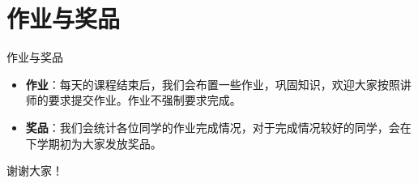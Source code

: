 \documentclass{beamer}
\begin{document}
    \section{作业与奖品}

    \begin{frame}{作业与奖品}
        \begin{itemize}
            \item \textbf{作业}：每天的课程结束后，我们会布置一些作业，巩固知识，欢迎大家按照讲师的要求提交作业。作业不强制要求完成。
            \item \textbf{奖品}：我们会统计各位同学的作业完成情况，对于完成情况较好的同学，会在下学期初为大家发放奖品。
        \end{itemize}
    \end{frame}
	
	\begin{frame}{}
	    \centering \Huge{\heiti 谢谢大家！}
	\end{frame}
	
\end{document}
